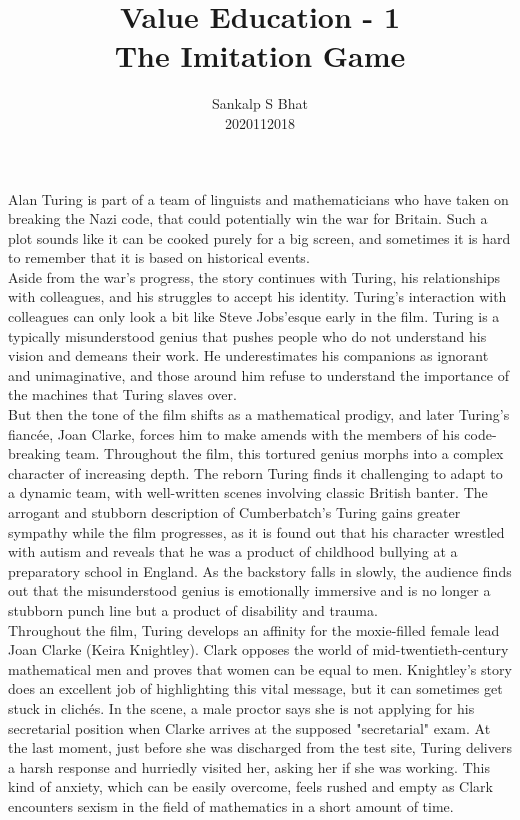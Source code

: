 \documentclass[a4paper, 12pt]{extarticle}
\title{Value Education - 1\\
\bf{The Imitation Game}}
\author{Sankalp S Bhat\\
2020112018
}
\begin{document}
\maketitle
\thispagestyle{empty}

Alan Turing is part of a team of linguists and mathematicians who have taken on breaking the Nazi code, that could potentially win the war for Britain. Such a plot sounds like it can be cooked purely for a big screen, and sometimes it is hard to remember that it is based on historical events.\\ 

Aside from the war's progress, the story continues with Turing, his relationships with colleagues, and his struggles to accept his identity. Turing's interaction with colleagues can only look a bit like Steve Jobs'esque early in the film. Turing is a typically misunderstood genius that pushes people who do not understand his vision and demeans their work. He underestimates his companions as ignorant and unimaginative, and those around him refuse to understand the importance of the machines that Turing slaves over.\\

But then the tone of the film shifts as a mathematical prodigy, and later Turing’s fiancée, Joan Clarke, forces him to make amends with the members of his code-breaking team. Throughout the film, this tortured genius morphs into a complex character of increasing depth. The reborn Turing finds it challenging to adapt to a dynamic team, with well-written scenes involving classic British banter. The arrogant and stubborn description of Cumberbatch’s Turing gains greater sympathy while the film progresses, as it is found out that his character wrestled with autism and reveals that he was a product of childhood bullying at a preparatory school in England. As the backstory falls in slowly, the audience finds out that the misunderstood genius is emotionally immersive and is no longer a stubborn punch line but a product of disability and trauma.\\

Throughout the film, Turing develops an affinity for the moxie-filled female lead Joan Clarke (Keira Knightley). Clark opposes the world of mid-twentieth-century mathematical men and proves that women can be equal to men. Knightley's story does an excellent job of highlighting this vital message, but it can sometimes get stuck in clichés. In the scene, a male proctor says she is not applying for his secretarial position when Clarke arrives at the supposed "secretarial" exam. At the last moment, just before she was discharged from the test site, Turing delivers a harsh response and hurriedly visited her, asking her if she was working. This kind of anxiety, which can be easily overcome, feels rushed and empty as Clark encounters sexism in the field of mathematics in a short amount of time.\\
\end{document}
